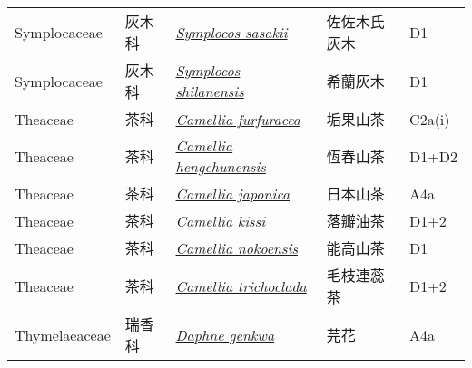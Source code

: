 {\begin{longtable}{L{2.5cm}L{2cm}L{5cm}L{2.5cm}L{3cm}}
    Symplocaceae & 灰木科 & \href{http://www.theplantlist.org/tpl1.1/search?q=Symplocos+sasakii}{\textit{Symplocos sasakii} } & 佐佐木氏灰木 & D1    \\
    Symplocaceae & 灰木科 & \href{http://www.theplantlist.org/tpl1.1/search?q=Symplocos+shilanensis}{\textit{Symplocos shilanensis} } & 希蘭灰木 & D1    \\
    Theaceae & 茶科 & \href{http://www.theplantlist.org/tpl1.1/search?q=Camellia+furfuracea}{\textit{Camellia furfuracea} } & 垢果山茶 & C2a(i)    \\
    Theaceae & 茶科 & \href{http://www.theplantlist.org/tpl1.1/search?q=Camellia+hengchunensis}{\textit{Camellia hengchunensis} } & 恆春山茶 & D1+D2    \\
    Theaceae & 茶科 & \href{http://www.theplantlist.org/tpl1.1/search?q=Camellia+japonica}{\textit{Camellia japonica} } & 日本山茶 & A4a    \\
    Theaceae & 茶科 & \href{http://www.theplantlist.org/tpl1.1/search?q=Camellia+kissi}{\textit{Camellia kissi} } & 落瓣油茶 & D1+2    \\
    Theaceae & 茶科 & \href{http://www.theplantlist.org/tpl1.1/search?q=Camellia+nokoensis}{\textit{Camellia nokoensis} } & 能高山茶 & D1    \\
    Theaceae & 茶科 & \href{http://www.theplantlist.org/tpl1.1/search?q=Camellia+trichoclada}{\textit{Camellia trichoclada} } & 毛枝連蕊茶 & D1+2    \\
    Thymelaeaceae & 瑞香科 & \href{http://www.theplantlist.org/tpl1.1/search?q=Daphne+genkwa}{\textit{Daphne genkwa} } & 芫花 & A4a    \\

\end{longtable}}

